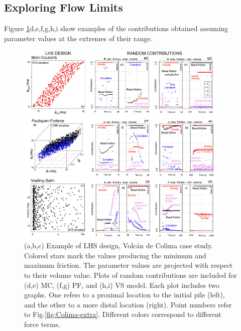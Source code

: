 \documentclass{article}
\begin{document}

\subsection{Exploring Flow Limits}
Figure \ref{fig:Colima-CC1}d,e,f,g,h,i show examples of the  contributions obtained assuming parameter values at the extremes of their range.
\begin{figure}[H]
         \centering
        \includegraphics[width=0.9\textwidth]{figures/Colima/SensitivityFigure.jpg}
        \caption{(a,b,c) Example of LHS design, Volc\'an de Colima case study. Colored stars mark the values producing the minimum and maximum friction. The parameter values are projected with respect to their volume value. Plots of random contributions are included for (d,e) MC, (f,g) PF, and (h,i) VS model. Each plot includes two graphs. One refers to a proximal location to the initial pile (left), and the other to a more distal location (right). Point numbers refer to Fig.\ref{fig:Colima-extra}. Different colors correspond to different force terms.}
        \label{fig:Colima-CC1}
\end{figure}
\end{document}
